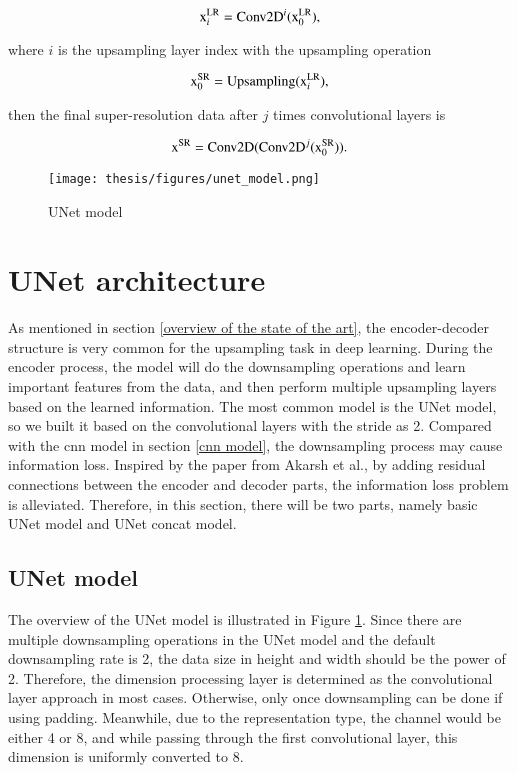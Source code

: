 \begin{equation}
    \centering
    \text{x}^{\text{LR}}_i = \text{Conv2D}^{i}(\text{x}^{\text{LR}}_0),
\end{equation}

where $i$ is the upsampling layer index with the upsampling operation

\begin{equation}
    \centering
    \text{x}^{\text{SR}}_0 = \text{Upsampling}(\text{x}^{\text{LR}}_i),
\end{equation}

then the final super-resolution data after $j$ times convolutional layers is

\begin{equation}
    \centering
    \text{x}^{\text{SR}} = \text{Conv2D}(\text{Conv2D}^{j}(\text{x}^{\text{SR}}_0)).
\end{equation}

\begin{figure}[t]
	\centering
	\texttt{[image: thesis/figures/unet\_model.png]}
	\caption{UNet model}
	\label{unet model}
\end{figure}

\section{UNet architecture} \label{u-net architecture}
As mentioned in section \ref{overview of the state of the art}, the encoder-decoder structure is very common for the upsampling task in deep learning. During the encoder process, the model will do the downsampling operations and learn important features from the data, and then perform multiple upsampling layers based on the learned information. The most common model is the UNet model, so we built it based on the convolutional layers with the stride as 2. Compared with the \gls{cnn} model in section \ref{cnn model}, the downsampling process may cause information loss. Inspired by the paper \cite{prabhakara_high_2023} from Akarsh et al., by adding residual connections between the encoder and decoder parts, the information loss problem is alleviated. Therefore, in this section, there will be two parts, namely basic UNet model and UNet concat model.

\subsection{UNet model} \label{UNet model subsection}
The overview of the UNet model is illustrated in Figure \ref{unet model}. Since there are multiple downsampling operations in the UNet model and the default downsampling rate is 2, the data size in height and width should be the power of 2. Therefore, the dimension processing layer is determined as the convolutional layer approach in most cases. Otherwise, only once downsampling can be done if using padding. Meanwhile, due to the representation type, the channel would be either 4 or 8, and while passing through the first convolutional layer, this dimension is uniformly converted to 8.

